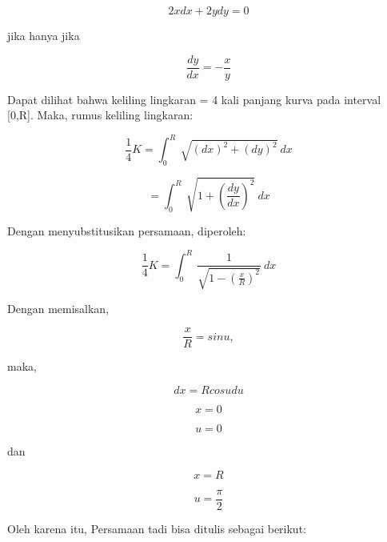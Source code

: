 \documentclass{article}
\begin{document}
\begin{eulernotebook}
\begin{eulercomment}
\begin{eulercomment}
\begin{eulercomment}
\begin{eulercomment}
\begin{eulercomment}
\end{eulercomment}
\begin{eulerformula}
\[
2x dx + 2y dy = 0
\]
\end{eulerformula}
\begin{eulercomment}
jika hanya jika\\
\end{eulercomment}
\begin{eulerformula}
\[
\frac{dy}{dx} = - \frac{x}{y}
\]
\end{eulerformula}
\begin{eulercomment}
Dapat dilihat bahwa keliling lingkaran = 4 kali panjang kurva pada
interval [0,R]. Maka, rumus keliling lingkaran:

\end{eulercomment}
\begin{eulerformula}
\[
\frac{1}{4} K = \int_{0}^{R} \ \sqrt{(dx)^2+(dy)^2} \ dx
\]
\end{eulerformula}
\begin{eulerformula}
\[
= \int_{0}^{R} \ \sqrt{1+(\frac{dy}{dx})^2} \ dx
\]
\end{eulerformula}
\begin{eulercomment}
Dengan menyubstitusikan persamaan, diperoleh:

\end{eulercomment}
\begin{eulerformula}
\[
\frac{1}{4} K = \int_{0}^{R} \ \frac{1}{\sqrt{1-(\frac{x}{R})^2}} \ dx
\]
\end{eulerformula}
\begin{eulercomment}
Dengan memisalkan,

\end{eulercomment}
\begin{eulerformula}
\[
\frac{x}{R} = sinu,
\]
\end{eulerformula}
\begin{eulercomment}
maka,\\
\end{eulercomment}
\begin{eulerformula}
\[
dx=R cosu du
\]
\end{eulerformula}
\begin{eulerformula}
\[
x=0
\]
\end{eulerformula}
\begin{eulerformula}
\[
u=0
\]
\end{eulerformula}
\begin{eulercomment}
dan\\
\end{eulercomment}
\begin{eulerformula}
\[
x=R
\]
\end{eulerformula}
\begin{eulerformula}
\[
u=\frac{\pi}{2}
\]
\end{eulerformula}
\begin{eulercomment}
Oleh karena itu, Persamaan tadi bisa ditulis sebagai berikut:


\end{eulercomment}
\end{eulercomment}
\end{eulercomment}
\end{eulercomment}
\end{eulercomment}
\end{eulernotebook}
\end{document}
